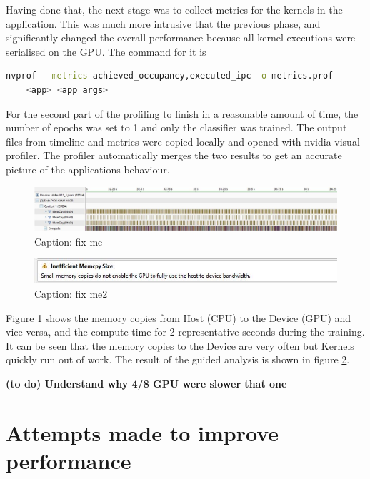 Having done that, the next stage was to collect metrics for the kernels in the application.  This was much more intrusive that the previous phase, and significantly changed the overall performance because all kernel executions were serialised on the GPU. The command for it is
 \begin{lstlisting}[language=bash]
nvprof --metrics achieved_occupancy,executed_ipc -o metrics.prof 
    <app> <app args>\end{lstlisting}

For the second part of the profiling to finish in a reasonable amount of time, the number of epochs was set to 1 and only the classifier was trained. The output files from timeline and metrics were copied locally and opened with nvidia visual profiler. The profiler automatically merges the two results to get an accurate picture of the applications behaviour.

\begin{figure}[H]
    \centering
    \includegraphics[width=\linewidth]{images/nv13.jpeg}
    \caption{Caption: fix me}
    \label{fig:nvprof1}
\end{figure}

\begin{figure}[H]
    \centering
    \includegraphics[width=\linewidth]{images/nvwarning.jpeg}
    \caption{Caption: fix me2}
    \label{fig:nvprof2}
\end{figure}



Figure \ref{fig:nvprof1} shows the memory copies from Host (CPU) to the Device (GPU) and vice-versa, and the compute time for 2 representative seconds during the training. It can be seen that the memory copies to the Device are very often but Kernels quickly run out of work. The result of the guided analysis is shown in figure \ref{fig:nvprof2}.   

\textbf{(to do) Understand why 4/8 GPU were slower that one}

 
\section{Attempts made to improve performance}

